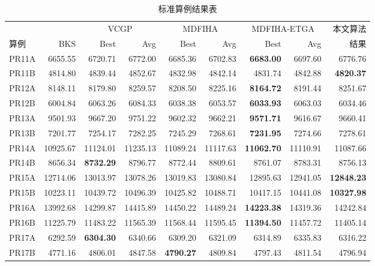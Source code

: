 \documentclass{setp-new}
\begin{document}
\begin{table}[htbp]
  \centering
  \caption{标准算例结果表}
  \label{tab:benchmark-results}
  \small
  \renewcommand{\arraystretch}{0.86}
  \setlength{\tabcolsep}{1.1pt}
  \begin{tabular*}{\textwidth}{@{\extracolsep{\fill}}lrrrrrrrr@{}}
    \toprule
    & & \multicolumn{2}{c}{VCGP\cite{ref:74}} & \multicolumn{2}{c}{MDFIHA\cite{ref:75}} & \multicolumn{2}{c}{MDFIHA-ETGA\cite{ref:75}} & 本文算法\\
    \cmidrule(lr){3-4}\cmidrule(lr){5-6}\cmidrule(lr){7-8}
    算例 & BKS & Best & Avg & Best & Avg & Best & Avg & 结果\\
    \midrule
    PR11A & 6655.55 & 6720.71 & 6772.00 & 6685.36 & 6702.83 & \textbf{6683.00} & 6697.60 & 6776.76\\
    PR11B & 4814.80 & 4839.44 & 4852.67 & 4832.98 & 4842.14 & 4831.74 & 4842.88 & \textbf{4820.37}\\
    PR12A & 8148.11 & 8179.80 & 8259.57 & 8208.50 & 8225.16 & \textbf{8164.72} & 8191.44 & 8251.67\\
    PR12B & 6004.84 & 6063.26 & 6084.33 & 6038.38 & 6053.57 & \textbf{6033.93} & 6063.03 & 6034.46\\
    PR13A & 9501.93 & 9667.20 & 9751.22 & 9602.32 & 9662.21 & \textbf{9571.71} & 9616.67 & 9660.41\\
    PR13B & 7201.77 & 7254.17 & 7282.25 & 7245.29 & 7268.61 & \textbf{7231.95} & 7274.66 & 7278.61\\
    PR14A & 10925.67 & 11124.01 & 11235.13 & 11089.24 & 11117.63 & \textbf{11062.70} & 11110.91 & 11087.66\\
    PR14B & 8656.34 & \textbf{8732.29} & 8796.77 & 8772.44 & 8809.61 & 8761.07 & 8783.31 & 8756.13\\
    PR15A & 12714.06 & 13013.97 & 13078.26 & 13019.83 & 13080.84 & 12895.63 & 12941.05 & \textbf{12848.23}\\
    PR15B & 10223.11 & 10439.72 & 10496.39 & 10425.82 & 10488.71 & 10417.15 & 10441.08 & \textbf{10327.98}\\
    PR16A & 13992.68 & 14299.87 & 14415.89 & 14450.22 & 14489.24 & \textbf{14223.38} & 14319.36 & 14242.84\\
    PR16B & 11225.79 & 11483.22 & 11565.39 & 11568.44 & 11595.45 & \textbf{11394.50} & 11457.72 & 11405.14\\
    PR17A & 6292.59 & \textbf{6304.30} & 6340.66 & 6309.20 & 6321.09 & 6314.89 & 6335.83 & 6316.22\\
    PR17B & 4771.16 & 4806.01 & 4847.58 & \textbf{4790.27} & 4809.84 & 4797.43 & 4811.54 & 4796.94\\

\end{tabular*}
\end{table}
\end{document}
